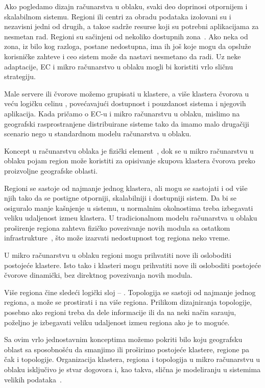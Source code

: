 Ako pogledamo dizajn ra\v cunarstva u oblaku, svaki deo doprinosi otpornijem i skalabilnom sistemu. Regioni ili centri za obradu podataka izolovani su i nezavisni jedni od drugih, a tako\dj e sadr\v ze resurse koji su potrebni aplikacijama za nesmetan rad. Regioni su sa\v cinjeni od nekoliko dostupnih zona~\cite{SouzaMFAK19}. Ako neka od zona, iz bilo kog razloga, postane nedostupna, ima ih jo\v s koje mogu da opslu\v ze korisni\v cke zahteve i ceo sistem mo\v ze da nastavi nesmetano da radi. Uz neke adaptacije, EC i mikro ra\v cunarstvo u oblaku mogli bi koristiti vrlo sli\v cnu strategiju.

Male servere ili \v cvorove mo\v zemo grupisati u klastere, a vi\v se klastera \v cvorova u ve\'cu logi\v cku celinu , pove\'cavaju\'ci dostupnost i pouzdanost sistema i njegovih aplikacija. Kada pri\v camo o EC-u i mikro ra\v cunarstvu u oblaku, mislimo na geografski rasprostranjene distribuirane sisteme tako da imamo malo druga\v ciji scenario nego u standardnom modelu ra\v cunarstva u oblaku. 

Koncept  u ra\v cunarstvu oblaka je fizi\v cki element~\cite{SouzaMFAK19}, dok se u mikro ra\v cunarstvu u oblaku pojam region mo\v ze koristiti za opisivanje skupova klastera \v cvorova preko proizvoljne geografske oblasti. 

Regioni se sastoje od najmanje jednog klastera, ali mogu se sastojati i od vi\v se njih tako da se postigne otporniji, skalabilniji i dostupniji sistem. Da bi se osiguralo manje ka\v snjenje u sistemu, u normalnim okolnostima treba izbegavati veliku udaljenost izme\dj u klastera. U tradicionalnom modelu ra\v cunarstva u oblaku pro\v sirenje regiona zahteva fizi\v cko povezivanje novih modula sa ostatkom infrastrukture~\cite{Hamilton07}, \v sto mo\v ze izazvati nedostupnost tog regiona neko vreme. 

U mikro ra\v cunarstvu u oblaku regioni mogu prihvatiti nove ili osloboditi postoje\'ce klastere. Isto tako i klasteri mogu prihvatiti nove ili osloboditi postoje\'ce \v cvorove dinami\v cki, bez direktnog povezivanja novih modula.

Vi\v se regiona \v cine slede\'ci logi\v cki sloj -- . Topologija se sastoji od najmanje jednog regiona, a mo\v ze se prostirati i na vi\v se regiona. Prilikom dizajniranja topologije, posebno ako regioni treba da dele informacije ili da na neki na\v cin sara\dj uju, po\v zeljno je izbegavati veliku udaljenost izme\dj u regiona ako je to mogu\'ce. 

Sa ovim vrlo jednostavnim konceptima mo\v zemo pokriti bilo koju geografsku oblast sa sposobno\v s\'cu da smanjimo ili pro\v sirimo postoje\'ce klastere, regione pa \v cak i topologije. Organizacija klastera, regiona i topologija u mikro ra\v cunarstvu u oblaku isklju\v civo je stvar dogovora i, kao takva, sli\v cna je modeliranju u sistemima velikih podataka~\cite{SonbolOAA20, WangCAL14}.

